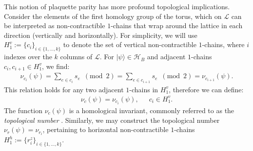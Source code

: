 \documentclass[12pt]{article}
\theoremstyle{definition}
\begin{document}
This notion of plaquette parity has more profound topological implications. Consider the elements of the first homology group of the torus, which on $\mathcal{L}$ can be interpreted as non-contractible $1$-chains that wrap around the lattice in each direction (vertically and horizontally). For simplicity, we will use $H^v_1 := \{c_i\}_{i\in\{1,...,k\}}$ to denote the set of vertical non-contractible $1$-chains, where $i$ indexes over the $k$ columns of $\mathcal{L}$. For $|\psi\rangle\in\mathcal{H}_B$ and adjacent $1$-chains $c_i,c_{i+1}\in H^v_1$, we find:
    \begin{align}
        \nu_{c_i}(\psi) = \sum_{e\in c_i}s_e\enspace (\text{mod}\enspace2) = \sum_{e\in c_{i+1}}s_e\enspace (\text{mod}\enspace2) = \nu_{c_{i+1}}(\psi).
    \end{align}
This relation holds for any two adjacent $1$-chains in $H^v_1$, therefore we can define:
    \begin{align}
        \nu_c(\psi) = \nu_{c_i}(\psi),\enspace\enspace\enspace c_i\in H^v_1.
    \end{align}
The function $\nu_c(\psi)$ is a homological invariant, commonly referred to as the \emph{topological number} \cite{kitaev1997}. Similarly, we may construct the topological number $\nu_r(\psi) = \nu_{r_i}$, pertaining to horizontal non-contractible $1$-chains $H^h_1 := \{r^z_i\}_{i\in\{1,...,k\}}$.
\end{document}
